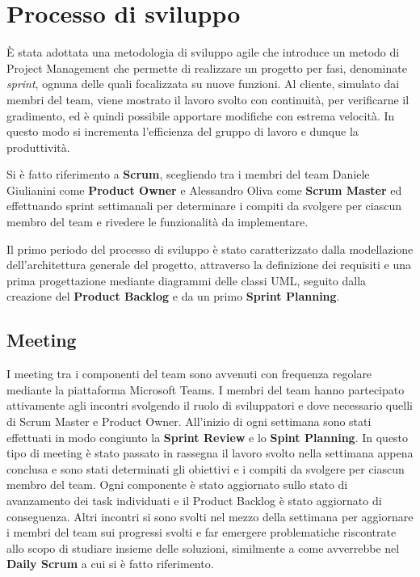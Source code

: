 \chapter{Processo di sviluppo}
È stata adottata una metodologia di sviluppo agile che introduce un metodo di Project Management che permette di realizzare un progetto per fasi, denominate \textit{sprint}, ognuna delle quali focalizzata su nuove funzioni. Al cliente, simulato dai membri del team, viene mostrato il lavoro svolto con continuità, per verificarne il gradimento, ed è quindi possibile apportare modifiche con estrema velocità. In questo modo si incrementa l’efficienza del gruppo di lavoro e dunque la produttività.

Si è fatto riferimento a \textbf{Scrum}, scegliendo tra i membri del team Daniele Giulianini come \textbf{Product Owner} e Alessandro Oliva come \textbf{Scrum Master} ed effettuando sprint settimanali per determinare i compiti da svolgere per ciascun membro del team e rivedere le funzionalità da implementare.

Il primo periodo del processo di sviluppo è stato caratterizzato dalla modellazione dell'architettura generale del progetto, attraverso la definizione dei requisiti e una prima progettazione mediante diagrammi delle classi UML, seguito dalla creazione del \textbf{Product Backlog} e da un primo \textbf{Sprint Planning}.

\section{Meeting}
I meeting tra i componenti del team sono avvenuti con frequenza regolare mediante la piattaforma Microsoft Teams. 
I membri del team hanno partecipato attivamente agli incontri svolgendo il ruolo di sviluppatori e dove necessario quelli di Scrum Master e Product Owner.
All'inizio di ogni settimana sono stati effettuati in modo congiunto la \textbf{Sprint Review} e lo \textbf{Spint Planning}. In questo tipo di meeting è stato passato in rassegna il lavoro svolto nella settimana appena conclusa e sono stati determinati gli obiettivi e i compiti da svolgere per ciascun membro del team. Ogni componente è stato aggiornato sullo stato di avanzamento dei task individuati e il Product Backlog è stato aggiornato di conseguenza. Altri incontri si sono svolti nel mezzo della settimana per aggiornare i membri del team sui progressi svolti e far emergere problematiche riscontrate allo scopo di studiare insieme delle soluzioni, similmente a come avverrebbe nel \textbf{Daily Scrum} a cui si è fatto riferimento.

